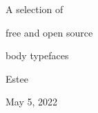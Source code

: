 
\line{}\baselineskip
\startcenter
{}

A selection of

\vskip 10pt
free and open source

\vskip 10pt
body typefaces

\baselineskip

\asterism

\baselineskip

Estee

\vskip 10pt
May 5, 2022

\stopcenter

\vfil\eject
